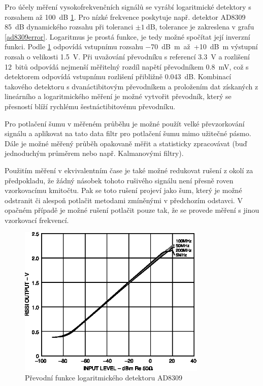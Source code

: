 Pro účely měření vysokofrekvenčních signálů se vyrábí logaritmické detektory s rozsahem až \SI{100}{\deci\bel} \cite{AD8309datasheet} \ref{ad8309function}. Pro nízké frekvence poskytuje např. detektor AD8309 \SI{85}{\deci\bel} dynamického rozsahu při toleranci $\pm \SI{1}{\deci\bel}$, tolerance je zakreslena v grafu \ref{ad8309error}. Logaritmus je prostá funkce, je tedy možné spočítat její inverzní funkci. Podle \ref{ad8309function} odpovídá vstupnímu rozsahu \SI{-70}{\deci\bel m}~až~+\SI{10}{\deci\bel m} výstupní rozsah o velikosti \SI{1.5}{\volt}. Při uvažování převodníku s referencí \SI{3.3}{\volt} a rozlišení 12~bitů odpovídá nejmenší měřitelný rozdíl napětí převodníkem \SI{0.8}{\milli\volt}, což s detektorem odpovídá vstupnímu rozlišení přibližně \SI{0.043}{\deci\bel}. Kombinací takového detektoru s dvanáctibitovým převodníkem a proložením dat získaných z lineárního a logaritmického měření je možné vytvořit převodník, který se přesností blíží rychlému šestnáctibitovému převodníku.

Pro potlačení šumu v měřeném průběhu je možné použít velké převzorkování signálu a aplikovat na tato data filtr pro potlačení šumu mimo užitečné pásmo. Dále je možné měřený průběh opakovaně měřit a statisticky zpracovávat (buď jednoduchým průměrem nebo např. Kalmanovými filtry).

Použitím měření v ekvivalentním čase je také možné redukovat rušení z okolí za předpokladu, že žádný násobek tohoto rušivého signálu není přesně roven vzorkovacímu kmitočtu. Pak se toto rušení projeví jako šum, který je možné odstranit či alespoň potlačit metodami zmíněnými v předchozím odstavci. V opačném případě je možné rušení potlačit pouze tak, že se provede měření s jinou vzorkovací frekvencí.

\begin{figure}[htbp]\includegraphics[width=0.8\textwidth,keepaspectratio]{images/AD8309_function.eps}\caption{Převodní funkce logaritmického detektoru AD8309 \cite{AD8309datasheet}}\label{ad8309function}\end{figure}	

